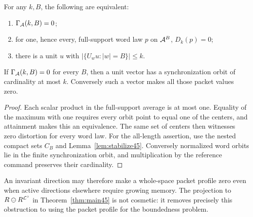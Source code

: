 \begin{proposition}\label{prop:zero-packet45}
For any $k,B$, the following are equivalent:
\begin{enumerate}
\item $\Gamma_{\mathcal A}(k,B)=0$;
\item for one, hence every, full-support word law $p$ on $\mathcal A^B$, $D_k(p)=0$;
\item there is a unit $u$ with $|\{U_wu:|w|=B\}|\le k$.
\end{enumerate}
If $\Gamma_{\mathcal A}(k,B)=0$ for every $B$, then a unit vector has a synchronization orbit of cardinality at most $k$. Conversely such a vector makes all those packet values zero.
\end{proposition}
\begin{proof}
Each scalar product in the full-support average is at most one. Equality of the maximum with one requires every orbit point to equal one of the centers, and attainment makes this an equivalence. The same set of centers then witnesses zero distortion for every word law. For the all-length assertion, use the nested compact sets $C_B$ and Lemma~\ref{lem:stabilize45}. Conversely normalized word orbits lie in the finite synchronization orbit, and multiplication by the reference command preserves their cardinality.
\end{proof}

An invariant direction may therefore make a whole-space packet profile zero even when active directions elsewhere require growing memory. The projection to $R\ominus R^{\mathcal L^\circ}$ in Theorem~\ref{thm:main45} is not cosmetic: it removes precisely this obstruction to using the packet profile for the boundedness problem.
